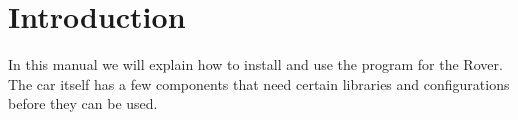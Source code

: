 \section{Introduction}
In this manual we will explain how to install and use the program for the Rover. The car itself has a few components that need certain libraries and configurations before they can be used.
